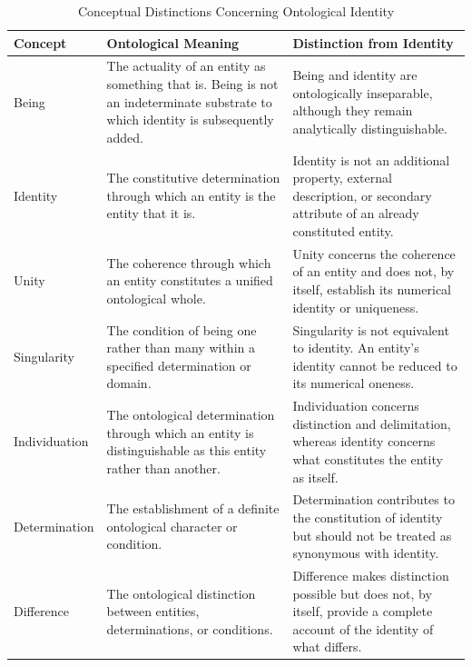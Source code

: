 
\begin{table}[htbp]
    \centering
    \caption{Conceptual Distinctions Concerning Ontological Identity}
    \label{tab:identity-conceptual-distinctions}

    \renewcommand{\arraystretch}{1.35}
    \begin{tabular}{p{3.2cm} p{5.2cm} p{5.2cm}}
        \hline
        \textbf{Concept} &
        \textbf{Ontological Meaning} &
        \textbf{Distinction from Identity} \\
        \hline

        Being &
        The actuality of an entity as something that is. Being is not an indeterminate substrate to which identity is subsequently added. &
        Being and identity are ontologically inseparable, although they remain analytically distinguishable. \\

        Identity &
        The constitutive determination through which an entity is the entity that it is. &
        Identity is not an additional property, external description, or secondary attribute of an already constituted entity. \\

        Unity &
        The coherence through which an entity constitutes a unified ontological whole. &
        Unity concerns the coherence of an entity and does not, by itself, establish its numerical identity or uniqueness. \\

        Singularity &
        The condition of being one rather than many within a specified determination or domain. &
        Singularity is not equivalent to identity. An entity's identity cannot be reduced to its numerical oneness. \\

        Individuation &
        The ontological determination through which an entity is distinguishable as this entity rather than another. &
        Individuation concerns distinction and delimitation, whereas identity concerns what constitutes the entity as itself. \\

        Determination &
        The establishment of a definite ontological character or condition. &
        Determination contributes to the constitution of identity but should not be treated as synonymous with identity. \\

        Difference &
        The ontological distinction between entities, determinations, or conditions. &
        Difference makes distinction possible but does not, by itself, provide a complete account of the identity of what differs. \\


\end{tabular}
\end{table}
